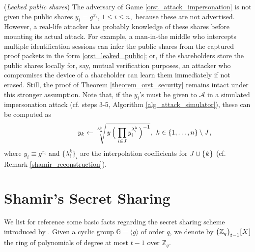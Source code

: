 \documentclass{iacrtrans}
\begin{document}
\begin{rem}\label{rem_leaked_public_shares}
(\textit{Leaked public shares})
The adversary of Game \ref{orst_attack_impersonation}
is not given the public shares
$y_i = g ^ {x_i},\hspace{2pt} 1 \le i \le n,$
because these are not advertised.
However, a real-life attacker has probably
knowledge of these shares before mounting
its actual attack.
For example, a man-in-the middle who intercepts multiple
identification sessions can infer the public shares
from the captured proof packets in the form
\eqref{orst_leaked_public};
or, if the shareholders store the public shares
locally for, say, mutual verification purposes,
an attacker who compromises the device of a shareholder
can learn them immediately if not erased.
Still, the proof of Theorem \ref{theorem_orst_security}
remains intact under this stronger assumption.
Note that, if the $y_i$'s must be given to $\mathcal{\bar{A}}$
in a simulated impersonation attack
(cf. steps 3-5, Algorithm \ref{alg_attack_simulator}),
these can be computed as
\vspace{5pt}
\begin{equation*}
\hspace{50pt}
y_k \leftarrow
\sqrt[\leftroot{0}\uproot{10}\lambda_k^k]{\hspace{1.5pt}y\hspace{1.5pt}
\Big(\hspace{1pt}\prod_{i \in J} y_i^{\lambda_i^k}\hspace{1pt}\Big)^{-1}},
\hspace{4pt} k \in \{1, \dots, n\} \setminus J\hspace{1pt},
\vspace{5pt}
\end{equation*}
where $y_i \equiv g ^ {x_i}$ and $\{\lambda_i^k\}_i$
are the interpolation coefficients for
$J \cup \{\hspace{0.5pt}k\hspace{0.5pt}\}$
(cf. Remark \ref{shamir_reconstruction}).
\end{rem}

\appendix

\section{Shamir's Secret Sharing}\label{section_shamir}

\noindent
We list for reference some basic facts regarding
the secret sharing scheme introduced by \cite{paper_shamir}.
Given a cyclic group $\mathbb{G} = \langle g \rangle$ of order $q$,
we denote by
$
\big(
	\hspace{0.3pt}
	\mathbb{Z}_q
	\hspace{0.3pt}
	\big)_{t-1}
	\hspace{0.3pt}
	[
		\hspace{0.5pt}
		X
		\hspace{0.5pt}
	]
$
the ring of polynomials of degree
at most $t-1$ over $\mathbb{Z}_q$.
\end{document}
